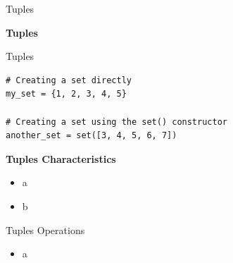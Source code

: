 \documentclass[
	11pt, 
]{beamer}
\begin{document}
\begin{frame}[fragile]{Tuples}
\scriptsize
    
\begin{block}{\textbf{Tuples}}

    Tuples

\end{block}
\begin{verbatim}
# Creating a set directly
my_set = {1, 2, 3, 4, 5}

# Creating a set using the set() constructor
another_set = set([3, 4, 5, 6, 7]) \end{verbatim}

\begin{exampleblock}{\textbf{Tuples Characteristics}}
    \begin{itemize}
        \item a
        \item b
    \end{itemize}    
\end{exampleblock}


\end{frame}




\begin{frame}[fragile]{Tuples Operations}
\scriptsize
\begin{itemize}
    \item a



    
\end{itemize}
\end{frame}

\end{document}

